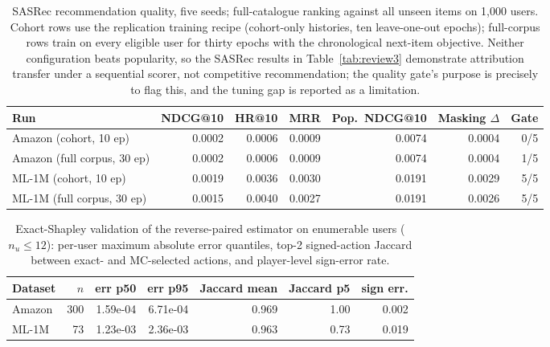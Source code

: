 \begin{table}[!htbp]\centering\scriptsize\setlength{\tabcolsep}{3pt}
\caption{SASRec recommendation quality, five seeds; full-catalogue ranking
against all unseen items on 1,000 users. Cohort rows use the replication
training recipe (cohort-only histories, ten leave-one-out epochs); full-corpus
rows train on every eligible user for thirty epochs with the chronological
next-item objective. Neither configuration beats popularity, so the SASRec
results in Table~\ref{tab:review3} demonstrate attribution transfer under a
sequential scorer, not competitive recommendation; the quality gate's purpose
is precisely to flag this, and the tuning gap is reported as a limitation.}
\label{tab:review5-sasrec-quality}
\begin{tabular}{@{}lrrrrrr@{}}
\toprule
Run & NDCG@10 & HR@10 & MRR & Pop.\ NDCG@10 & Masking $\Delta$ & Gate \\
\midrule
Amazon (cohort, 10 ep) & 0.0002 & 0.0006 & 0.0009 & 0.0074 & 0.0004 & 0/5 \\
Amazon (full corpus, 30 ep) & 0.0002 & 0.0006 & 0.0009 & 0.0074 & 0.0004 & 1/5 \\
ML-1M (cohort, 10 ep) & 0.0019 & 0.0036 & 0.0030 & 0.0191 & 0.0029 & 5/5 \\
ML-1M (full corpus, 30 ep) & 0.0015 & 0.0040 & 0.0027 & 0.0191 & 0.0026 & 5/5 \\
\bottomrule
\end{tabular}
\end{table}
\begin{table}[!htbp]\centering\scriptsize\setlength{\tabcolsep}{3pt}
\caption{Exact-Shapley validation of the reverse-paired estimator on
enumerable users ($n_u\le12$): per-user maximum absolute error quantiles,
top-2 signed-action Jaccard between exact- and MC-selected actions, and
player-level sign-error rate.}
\label{tab:review5-exact-dist}
\begin{tabular}{@{}lrrrrrr@{}}
\toprule
Dataset & $n$ & err p50 & err p95 & Jaccard mean & Jaccard p5 & sign err. \\
\midrule
Amazon & 300 & 1.59e-04 & 6.71e-04 & 0.969 & 1.00 & 0.002 \\
ML-1M & 73 & 1.23e-03 & 2.36e-03 & 0.963 & 0.73 & 0.019 \\
\bottomrule
\end{tabular}
\end{table}
